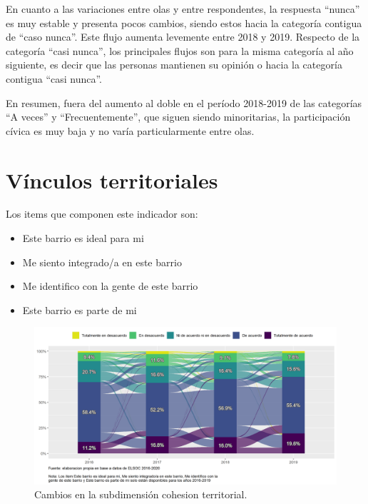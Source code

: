 \documentclass[
  12pt,
]{book}
\begin{document}
En cuanto a las variaciones entre olas y entre respondentes, la respuesta ``nunca'' es muy estable y presenta pocos cambios, siendo estos hacia la categoría contigua de ``caso nunca''. Este flujo aumenta levemente entre 2018 y 2019. Respecto de la categoría ``casi nunca'', los principales flujos son para la misma categoría al año siguiente, es decir que las personas mantienen su opinión o hacia la categoría contigua ``casi nunca''.

En resumen, fuera del aumento al doble en el período 2018-2019 de las categorías ``A veces'' y ``Frecuentemente'', que siguen siendo minoritarias, la participación cívica es muy baja y no varía particularmente entre olas.

\hypertarget{vuxednculos-territoriales}{%
\section{Vínculos territoriales}\label{vuxednculos-territoriales}}

Los items que componen este indicador son:

\begin{itemize}
\item
  Este barrio es ideal para mi
\item
  Me siento integrado/a en este barrio
\item
  Me identifico con la gente de este barrio
\item
  Este barrio es parte de mi
\end{itemize}

\begin{figure}[H]

{\centering \includegraphics[width=1\linewidth,height=1\textheight]{output/graphs/alluvial_cohesion_territorial} 

}

\caption{Cambios en la subdimensión cohesion territorial.}\label{fig:alluvial-cohesion-territorial}
\end{figure}
\end{document}
